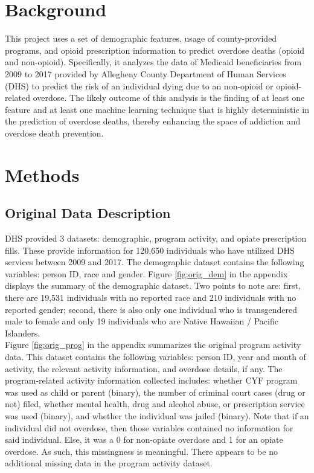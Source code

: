 \documentclass[twoside,10.5pt]{article}
\begin{document}
\section{Background}
This project uses a set of demographic features, usage of county-provided programs, and opioid prescription information to predict overdose deaths (opioid and non-opioid). Specifically, it analyzes the data of Medicaid beneficiaries from 2009 to 2017 provided by Allegheny County Department of Human Services (DHS) to predict the risk of an individual dying due to an non-opioid or opioid-related overdose. The likely outcome of this analysis is the finding of at least one feature and at least one machine learning technique that is highly deterministic in the prediction of overdose deaths, thereby enhancing the space of addiction and overdose death prevention. 

\section{Methods}
\subsection{Original Data Description}
DHS provided 3 datasets: demographic, program activity, and opiate prescription fills. These provide information for 120,650 individuals who have utilized DHS services between 2009 and 2017. The demographic dataset contains the following variables: person ID, race and gender. Figure \ref{fig:orig_dem} in the appendix displays the summary of the demographic dataset. Two points to note are: first, there are 19,531 individuals with no reported race and 210 individuals with no reported gender; second, there is also only one individual who is transgendered male to female and only 19 individuals who are Native Hawaiian / Pacific Islanders. \\

Figure \ref{fig:orig_prog} in the appendix summarizes the original program activity data. This dataset contains the following variables: person ID, year and month of activity, the relevant activity information, and overdose details, if any. The program-related activity information collected includes: whether CYF program was used as child or parent (binary), the number of criminal court cases (drug or not) filed, whether mental health, drug and alcohol abuse, or prescription service was used (binary), and whether the individual was jailed (binary). Note that if an individual did not overdose, then those variables contained no information for said individual. Else, it was a 0 for non-opiate overdose and 1 for an opiate overdose. As such, this missingness is meaningful. There appears to be no additional missing data in the program activity dataset. \\
\end{document}

